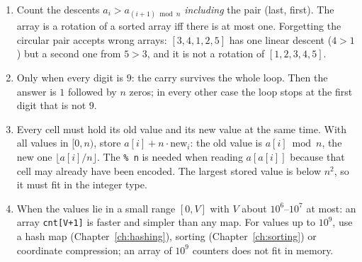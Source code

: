 \begin{solutionbox}
\begin{enumerate}[leftmargin=*]
    \item Count the descents $a_i > a_{(i+1) \bmod n}$ \emph{including} the pair (last, first). The array is a rotation of a sorted array iff there is at most one. Forgetting the circular pair accepts wrong arrays: $[3, 4, 1, 2, 5]$ has one linear descent ($4 > 1$) but a second one from $5 > 3$, and it is not a rotation of $[1, 2, 3, 4, 5]$.
    \item Only when every digit is $9$: the carry survives the whole loop. Then the answer is $1$ followed by $n$ zeros; in every other case the loop stops at the first digit that is not $9$.
    \item Every cell must hold its old value and its new value at the same time. With all values in $[0, n)$, store $a[i] + n \cdot \text{new}_i$: the old value is $a[i] \bmod n$, the new one $\lfloor a[i] / n \rfloor$. The \texttt{\% n} is needed when reading $a[a[i]]$ because that cell may already have been encoded. The largest stored value is below $n^2$, so it must fit in the integer type.
    \item When the values lie in a small range $[0, V]$ with $V$ about $10^6$--$10^7$ at most: an array \texttt{cnt[V+1]} is faster and simpler than any map. For values up to $10^9$, use a hash map (Chapter~\ref{ch:hashing}), sorting (Chapter~\ref{ch:sorting}) or coordinate compression; an array of $10^9$ counters does not fit in memory.
\end{enumerate}
\end{solutionbox}
\endgroup
